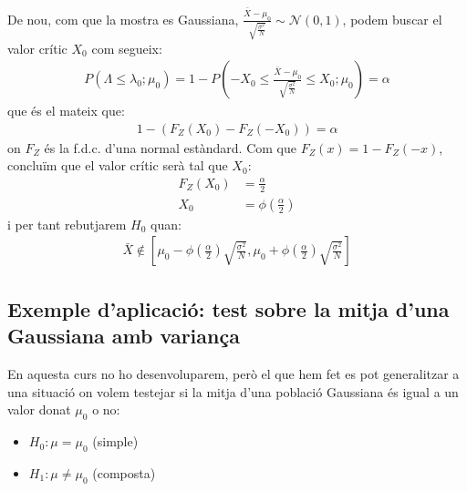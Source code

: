 \documentclass[letterpaper,10pt,english]{sphinxmanual}
\begin{document}
De nou, com que la mostra es Gaussiana, \(\frac{\bar{X} - \mu_0}{\sqrt{\frac{\sigma^2}{N}}} \sim \mathcal{N}(0, 1)\),
podem buscar el valor crític \(X_0\) com segueix:
\begin{equation*}
\begin{split}P(\Lambda \leq \lambda_0; \mu_0) = 1 - P(-X_0 \leq \frac{\bar{X} - \mu_0}{\sqrt{\frac{\sigma^2}{N}}} \leq X_0; \mu_0) = \alpha\end{split}
\end{equation*}
que és el mateix que:
\begin{equation*}
\begin{split}1 - (F_Z(X_0) - F_Z(-X_0)) = \alpha\end{split}
\end{equation*}
on \(F_Z\) és la f.d.c. d’una normal estàndard. Com que \(F_Z(x) = 1 - F_Z(-x)\),
concluïm que el valor crític serà tal que \(X_0\):
\begin{equation*}
\begin{split}F_Z(X_0) &= \frac{\alpha}{2} \\
X_0 &= \phi\left(\frac{\alpha}{2}\right)\end{split}
\end{equation*}
i per tant rebutjarem \(H_0\) quan:
\begin{equation*}
\begin{split}\bar{X} \not \in \left[\mu_0 - \phi\left(\frac{\alpha}{2}\right)\sqrt{\frac{\sigma^2}{N}}, \mu_0 + \phi\left(\frac{\alpha}{2}\right)\sqrt{\frac{\sigma^2}{N}}\right]\end{split}
\end{equation*}

\subsection{Exemple d’aplicació: test sobre la mitja d’una Gaussiana amb variança }
\label{\detokenize{0_Intro/0_4_Tests:exemple-d-aplicacio-test-sobre-la-mitja-d-una-gaussiana-amb-varianca-desconeguda}}
En aquesta curs no ho desenvoluparem, però el que hem fet es pot generalitzar
a una situació on volem testejar si la mitja d’una població Gaussiana és igual a
un valor donat \(\mu_0\) o no:
\begin{itemize}
\item {} 
\(H_0: \mu= \mu_0\) (simple)

\item {} 
\(H_1: \mu \neq \mu_0\) (composta)

\end{itemize}
\end{document}
